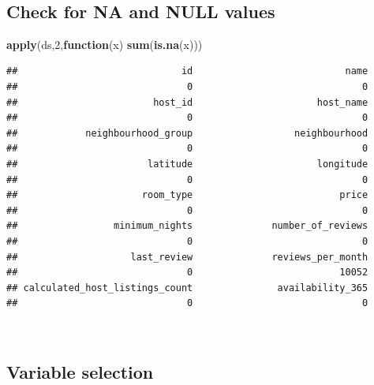 \documentclass[
]{article}
\newenvironment{Shaded}{\begin{snugshade}}{\end{snugshade}}
\newcommand{\ControlFlowTok}[1]{\textcolor[rgb]{0.13,0.29,0.53}{\textbf{#1}}}
\newcommand{\DecValTok}[1]{\textcolor[rgb]{0.00,0.00,0.81}{#1}}
\newcommand{\KeywordTok}[1]{\textcolor[rgb]{0.13,0.29,0.53}{\textbf{#1}}}
\newcommand{\NormalTok}[1]{#1}
\newcommand{\OperatorTok}[1]{\textcolor[rgb]{0.81,0.36,0.00}{\textbf{#1}}}
\newcommand{\StringTok}[1]{\textcolor[rgb]{0.31,0.60,0.02}{#1}}
\begin{document}
~\\

\hypertarget{check-for-na-and-null-values}{%
\subsection{Check for NA and NULL
values}\label{check-for-na-and-null-values}}

\begin{Shaded}
\begin{Highlighting}[]
\KeywordTok{apply}\NormalTok{(ds,}\DecValTok{2}\NormalTok{,}\ControlFlowTok{function}\NormalTok{(x) }\KeywordTok{sum}\NormalTok{(}\KeywordTok{is.na}\NormalTok{(x)))}
\end{Highlighting}
\end{Shaded}

\begin{verbatim}
##                             id                           name 
##                              0                              0 
##                        host_id                      host_name 
##                              0                              0 
##            neighbourhood_group                  neighbourhood 
##                              0                              0 
##                       latitude                      longitude 
##                              0                              0 
##                      room_type                          price 
##                              0                              0 
##                 minimum_nights              number_of_reviews 
##                              0                              0 
##                    last_review              reviews_per_month 
##                              0                          10052 
## calculated_host_listings_count               availability_365 
##                              0                              0
\end{verbatim}

~\\

\hypertarget{variable-selection}{%
\subsection{Variable selection}\label{variable-selection}}

\begin{Shaded}
\end{Shaded}
\end{document}
